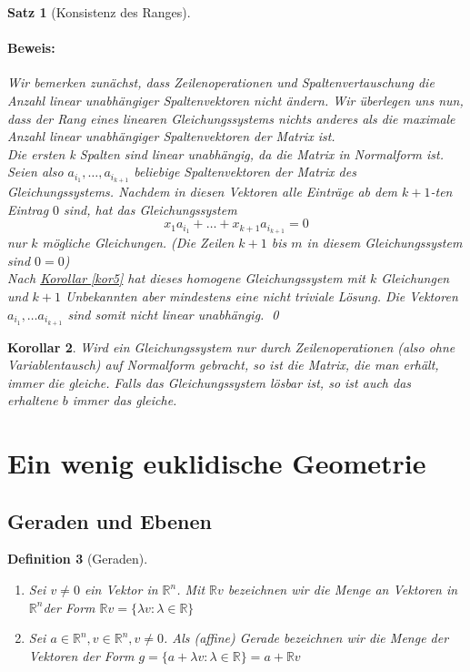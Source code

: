 \documentclass{report}
\newcommand{\IN}[1]{\index{#1|BH}}
\newcommand{\lb}{\lambda}
\newcommand{\R}{\mathbb{R}}
\newcommand{\Rn}{\mathbb{R}^n}
\newcommand{\mRn}{\(\mathbb{R}^n\)}
\theoremstyle{customrem}
\theoremstyle{customdef}
\newtheorem{definition}{Definition}[chapter]
\newtheorem{korrolar}[definition]{Korollar}
\newtheorem{satz}[definition]{Satz}
\renewenvironment{proof}{\paragraph{Beweis: }}{\qed}
\begin{document}
\begin{satz}[Konsistenz des Ranges]
\begin{enumerate}
		\end{enumerate}
		\begin{proof}
			Wir bemerken zunächst, dass Zeilenoperationen und Spaltenvertauschung die Anzahl linear unabhängiger Spaltenvektoren nicht ändern.
			Wir überlegen uns nun, dass der Rang eines linearen Gleichungssystems nichts anderes als die maximale Anzahl linear unabhängiger Spaltenvektoren der Matrix ist.\\
			Die ersten k Spalten sind linear unabhängig, da die Matrix in Normalform ist. Seien also \(a_{i_1}, \dots, a_{i_{k+1}}\) beliebige Spaltenvektoren der Matrix des Gleichungssystems. Nachdem in diesen Vektoren alle Einträge ab dem \(k+1\)-ten Eintrag \(0\) sind, hat das Gleichungssystem \\
			\[
			x_1a_{i_1} + \dots + x_{k+1}a_{i_{k+1}} = 0
			\]
			nur \(k\) mögliche Gleichungen. (Die Zeilen \(k+1\) bis \(m\) in diesem Gleichungssystem sind \(0=0\))\\
			Nach \hyperref[kor5]{Korollar \ref*{kor5}} hat dieses homogene Gleichungssystem mit \(k\) Gleichungen und \(k+1\) Unbekannten aber mindestens eine nicht triviale Lösung. Die Vektoren \(a_{i_1}, \dots a_{i_{k+1}}\) sind somit nicht linear unabhängig.
		\end{proof}
	\end{satz}
	\vspace{.2cm}
	\begin{korrolar}
		Wird ein Gleichungssystem \textit{nur} durch Zeilenoperationen (also ohne Variablentausch) auf Normalform gebracht, so ist die Matrix, die man erhält, immer die gleiche. Falls das Gleichungssystem lösbar ist, so ist auch das erhaltene \(b\) immer das gleiche.
	\end{korrolar}
	
	\section{Ein wenig euklidische Geometrie}
	
	\subsection{Geraden und Ebenen}
	
	\begin{definition}[Geraden]
		\IN{Gerade}
		\( \)\vspace{-.5cm}
		\begin{enumerate}
			\item Sei \(v \not= 0\) ein Vektor in \mRn. Mit \(\R v\) bezeichnen wir die Menge an Vektoren in \mRn der Form \(\R v = \{\lb v : \lb \in \R\}\)
			\item Sei \(a \in \Rn, v \in \Rn, v \neq 0\). Als (affine) Gerade bezeichnen wir die Menge der Vektoren der Form \(g = \{a + \lb v : \lb \in \R\} = a + \R v\)
		\end{enumerate}
	\end{definition}
	
\end{document}
